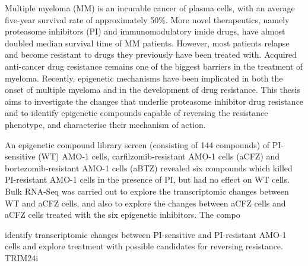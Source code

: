 
Multiple myeloma (MM) is an incurable cancer of plasma cells, with an average five-year survival rate of approximately 50\%.
More novel therapeutics, namely proteasome inhibitors (PI) and immunomodulatory imide drugs, have almost doubled median survival time of MM patients.
However, most patients relapse and become resistant to drugs they previously have been treated with.
Acquired anti-cancer drug resistance remains one of the biggest barriers in the treatment of myeloma.
Recently, epigenetic mechanisms have been implicated in both the onset of multiple myeloma and in the development of drug resistance.
This thesis aims to investigate the changes that underlie proteasome inhibitor drug resistance and to identify epigenetic compounds capable of reversing the resistance phenotype, and characterise their mechanism of action.

An epigenetic compound library screen (consisting of 144 compounds) of PI-sensitive (WT) AMO-1 cells, carfilzomib-resistant AMO-1 cells (aCFZ) and bortezomib-resistant AMO-1 cells (aBTZ) revealed six compounds which killed PI-resistant AMO-1 cells in the presence of PI, but had no effect on WT cells.
Bulk RNA-Seq was carried out to explore the transcriptomic changes between WT and aCFZ cells, and also to explore the changes between aCFZ cells and aCFZ cells treated with the six epigenetic inhibitors. The compo

identify transcriptomic changes between PI-sensitive and PI-resistant AMO-1 cells and explore treatment with possible candidates for reversing resistance. TRIM24i

